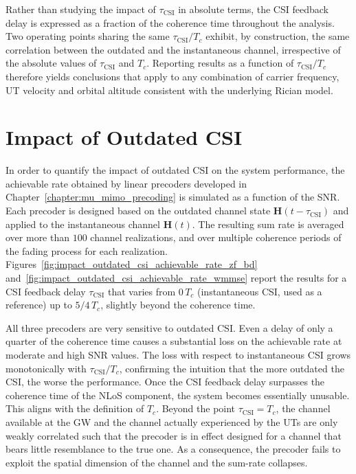 Rather than studying the impact of $\tau_{\mathrm{CSI}}$ in absolute terms, the \ac{CSI} feedback delay is expressed as a fraction of the coherence time throughout the analysis.
Two operating points sharing the same $\tau_{\mathrm{CSI}} / T_c$ exhibit, by construction, the same correlation between the outdated and the instantaneous channel, irrespective of the absolute values of $\tau_{\mathrm{CSI}}$ and $T_c$. 
Reporting results as a function of $\tau_{\mathrm{CSI}} / T_c$ therefore yields conclusions that apply to any combination of carrier frequency, \ac{UT} velocity and orbital altitude consistent with the underlying Rician model.

\section{Impact of Outdated CSI}
\label{section:outdated_csi_impact}

In order to quantify the impact of outdated \ac{CSI} on the system performance, the achievable rate obtained by linear precoders developed in Chapter~\ref{chapter:mu_mimo_precoding} is simulated as a function of the \ac{SNR}.
Each precoder is designed based on the outdated channel state $\mathbf{H}(t - \tau_{\mathrm{CSI}})$ and applied to the instantaneous channel $\mathbf{H}(t)$. The resulting sum rate is averaged over more than $100$ channel realizations, and over multiple coherence periods of the fading process for each realization.
Figures~\ref{fig:impact_outdated_csi_achievable_rate_zf_bd} and~\ref{fig:impact_outdated_csi_achievable_rate_wmmse} report the results for a \ac{CSI} feedback delay $\tau_{\mathrm{CSI}}$ that varies from $0 \, T_c$ (instantaneous \ac{CSI}, used as a reference) up to $5/4\, T_c$, slightly beyond the coherence time.

All three precoders are very sensitive to outdated \ac{CSI}. Even a delay of only a quarter of the coherence time causes a substantial loss on the achievable rate at moderate and high \ac{SNR} values. 
The loss with respect to instantaneous \ac{CSI} grows monotonically with $\tau_{\mathrm{CSI}}/T_c$, confirming the intuition that the more outdated the \ac{CSI}, the worse the performance.
Once the \ac{CSI} feedback delay surpasses the coherence time of the \ac{NLoS} component, the system becomes essentially unusable.
This aligns with the definition of $T_c$.
Beyond the point $\tau_{\mathrm{CSI}} = T_c$, the channel available at the \ac{GW} and the channel actually experienced by the \acp{UT} are only weakly correlated such that the precoder is in effect designed for a channel that bears little resemblance to the true one.
As a consequence, the precoder fails to exploit the spatial dimension of the channel and the sum-rate collapses.


